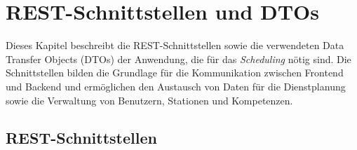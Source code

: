 \cleardoubleoddpage%
\chapter{REST-Schnittstellen und DTOs}
Dieses Kapitel beschreibt die REST-Schnittstellen sowie die verwendeten Data Transfer Objects (DTOs) der Anwendung, die für das \textit{Scheduling} nötig sind. Die Schnittstellen bilden die Grundlage für die Kommunikation zwischen Frontend und Backend und ermöglichen den Austausch von Daten für die Dienstplanung sowie die Verwaltung von Benutzern, Stationen und Kompetenzen.

\section{REST-Schnittstellen}

